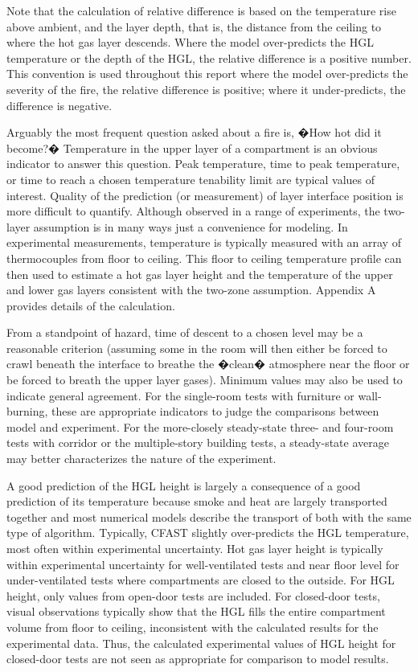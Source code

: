 Note that the calculation of relative difference is based on the temperature rise above ambient, and the layer depth, that is, the distance from the ceiling to where the hot gas layer descends.  Where the model over-predicts the HGL temperature or the depth of the HGL, the relative difference is a positive number. This convention is used throughout this report where the model over-predicts the severity of the fire, the relative difference is positive; where it under-predicts, the difference is negative.

Arguably the most frequent question asked about a fire is, �How hot did it become?�  Temperature in the upper layer of a compartment is an obvious indicator to answer this question.  Peak temperature, time to peak temperature, or time to reach a chosen temperature tenability limit are typical values of interest.  Quality of the prediction (or measurement) of layer interface position is more difficult to quantify.  Although observed in a range of experiments, the two-layer assumption is in many ways just a convenience for modeling.  In experimental measurements, temperature is typically measured with an array of thermocouples from floor to ceiling.  This floor to ceiling temperature profile can then used to estimate a hot gas layer height and the temperature of the upper and lower gas layers \cite{Janssens:1992} \cite{McGrattan:2003} consistent with the two-zone assumption. Appendix A provides details of the calculation.

From a standpoint of hazard, time of descent to a chosen level may be a reasonable criterion (assuming some in the room will then either be forced to crawl beneath the interface to breathe the �clean� atmosphere near the floor or be forced to breath the upper layer gases).  Minimum values may also be used to indicate general agreement.  For the single-room tests with furniture or wall-burning, these are appropriate indicators to judge the comparisons between model and experiment.  For the more-closely steady-state three- and four-room tests with corridor or the multiple-story building tests, a steady-state average may better characterizes the nature of the experiment.

A good prediction of the HGL height is largely a consequence of a good prediction of its temperature because smoke and heat are largely transported together and most numerical models describe the transport of both with the same type of algorithm.  Typically, CFAST slightly over-predicts the HGL temperature, most often within experimental uncertainty.  Hot gas layer height is typically within experimental uncertainty for well-ventilated tests and near floor level for under-ventilated tests where compartments are closed to the outside.  For HGL height, only values from open-door tests are included.  For closed-door tests, visual observations typically show that the HGL fills the entire compartment volume from floor to ceiling, inconsistent with the calculated results for the experimental data.  Thus, the calculated experimental values of HGL height for closed-door tests are not seen as appropriate for comparison to model results.

